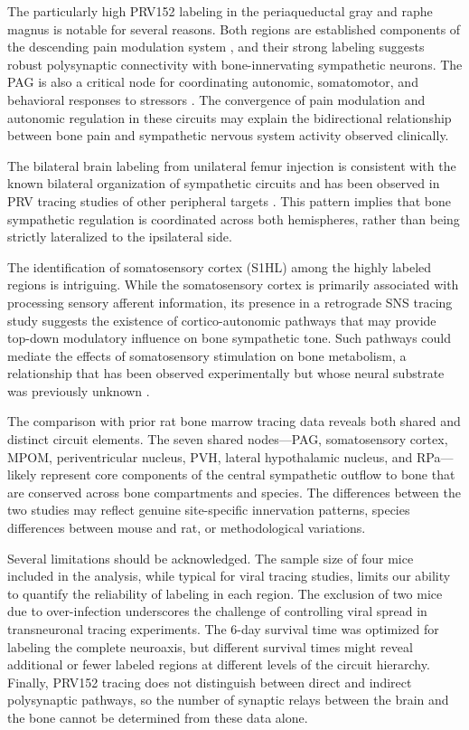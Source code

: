 \documentclass[12pt]{article}
\begin{document}
The particularly high PRV152 labeling in the periaqueductal gray and raphe magnus is notable for several reasons. Both regions are established components of the descending pain modulation system \citep{fields2004, basbaum2009}, and their strong labeling suggests robust polysynaptic connectivity with bone-innervating sympathetic neurons. The PAG is also a critical node for coordinating autonomic, somatomotor, and behavioral responses to stressors \citep{bandler2000}. The convergence of pain modulation and autonomic regulation in these circuits may explain the bidirectional relationship between bone pain and sympathetic nervous system activity observed clinically.

The bilateral brain labeling from unilateral femur injection is consistent with the known bilateral organization of sympathetic circuits and has been observed in PRV tracing studies of other peripheral targets \citep{stanley2010}. This pattern implies that bone sympathetic regulation is coordinated across both hemispheres, rather than being strictly lateralized to the ipsilateral side.

The identification of somatosensory cortex (S1HL) among the highly labeled regions is intriguing. While the somatosensory cortex is primarily associated with processing sensory afferent information, its presence in a retrograde SNS tracing study suggests the existence of cortico-autonomic pathways that may provide top-down modulatory influence on bone sympathetic tone. Such pathways could mediate the effects of somatosensory stimulation on bone metabolism, a relationship that has been observed experimentally but whose neural substrate was previously unknown \citep{sample2015}.

The comparison with prior rat bone marrow tracing data reveals both shared and distinct circuit elements. The seven shared nodes---PAG, somatosensory cortex, MPOM, periventricular nucleus, PVH, lateral hypothalamic nucleus, and RPa---likely represent core components of the central sympathetic outflow to bone that are conserved across bone compartments and species. The differences between the two studies may reflect genuine site-specific innervation patterns, species differences between mouse and rat, or methodological variations.

Several limitations should be acknowledged. The sample size of four mice included in the analysis, while typical for viral tracing studies, limits our ability to quantify the reliability of labeling in each region. The exclusion of two mice due to over-infection underscores the challenge of controlling viral spread in transneuronal tracing experiments. The 6-day survival time was optimized for labeling the complete neuroaxis, but different survival times might reveal additional or fewer labeled regions at different levels of the circuit hierarchy. Finally, PRV152 tracing does not distinguish between direct and indirect polysynaptic pathways, so the number of synaptic relays between the brain and the bone cannot be determined from these data alone.
\end{document}
